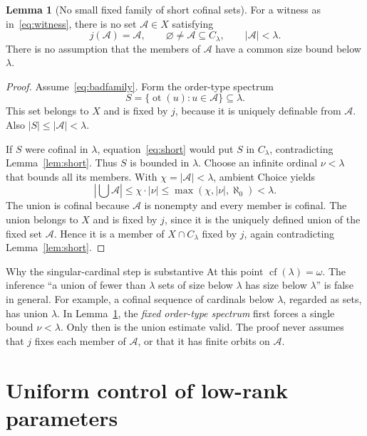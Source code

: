 \documentclass[11pt,letterpaper]{article}
\theoremstyle{definition}
\newtheorem{lemma}[definition]{Lemma}
\numberwithin{equation}{section}
\newcommand{\cf}{\operatorname{cf}}
\newcommand{\ot}{\operatorname{ot}}
\newcommand{\C}{C_\lambda}
\begin{document}
\begin{lemma}[No small fixed family of short cofinal sets]\label{lem:family}
For a witness as in~\eqref{eq:witness}, there is no set $\mathcal A\in X$ satisfying
\begin{equation}
j(\mathcal A)=\mathcal A,
\qquad \varnothing\ne\mathcal A\subseteq\C,
\qquad |\mathcal A|<\lambda.
\label{eq:badfamily}
\end{equation}
There is no assumption that the members of $\mathcal A$ have a common size bound below $\lambda$.
\end{lemma}
\begin{proof}
Assume~\eqref{eq:badfamily}. Form the order-type spectrum
\[
S=\{\ot(u):u\in\mathcal A\}\subseteq\lambda.
\]
This set belongs to $X$ and is fixed by $j$, because it is uniquely definable from $\mathcal A$. Also $|S|\le|\mathcal A|<\lambda$.

If $S$ were cofinal in $\lambda$, equation~\eqref{eq:short} would put $S$ in $\C$, contradicting Lemma~\ref{lem:short}. Thus $S$ is bounded in $\lambda$. Choose an infinite ordinal $\nu<\lambda$ that bounds all its members. With $\chi=|\mathcal A|<\lambda$, ambient Choice yields
\begin{equation}
\left|\bigcup\mathcal A\right|
\le \chi\cdot |\nu|
\le \max(\chi,|\nu|,\aleph_0)
<\lambda.
\label{eq:boundedunion}
\end{equation}
The union is cofinal because $\mathcal A$ is nonempty and every member is cofinal. The union belongs to $X$ and is fixed by $j$, since it is the uniquely defined union of the fixed set $\mathcal A$. Hence it is a member of $X\cap\C$ fixed by $j$, again contradicting Lemma~\ref{lem:short}.
\end{proof}

\begin{assessment}{Why the singular-cardinal step is substantive}
At this point $\cf(\lambda)=\omega$. The inference ``a union of fewer than $\lambda$ sets of size below $\lambda$ has size below $\lambda$'' is false in general. For example, a cofinal sequence of cardinals below $\lambda$, regarded as sets, has union $\lambda$. In Lemma~\ref{lem:family}, the \emph{fixed order-type spectrum} first forces a single bound $\nu<\lambda$. Only then is the union estimate valid. The proof never assumes that $j$ fixes each member of $\mathcal A$, or that it has finite orbits on $\mathcal A$.
\end{assessment}

\section{Uniform control of low-rank parameters}\label{sec:parameters}
\end{document}

